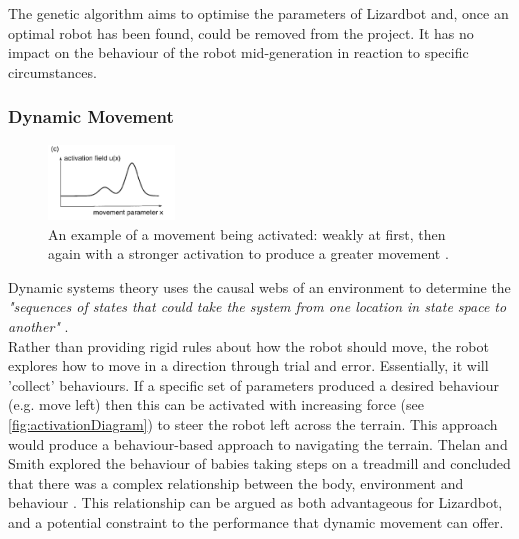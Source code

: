 \documentclass{article}
\begin{document}
The genetic algorithm aims to optimise the parameters of Lizardbot and, once an optimal robot has been found, could be removed from the project. It has no impact on the behaviour of the robot mid-generation in reaction to specific circumstances.\\

\newpage
\subsubsection{Dynamic Movement}
\label{sec:DST Aims}
\begin{figure}
    \centering
    \vspace*{-5mm}
    \includegraphics[width=0.3\textwidth]{activationExample}
    \caption{An example of a movement being activated: weakly at first, then again with a stronger activation to produce a greater movement \citep{dft}.}
    \label{fig:activationDiagram}
\end{figure}
Dynamic systems theory uses the causal webs of an environment to determine the \textit{"sequences of states that could take the system from one location in state space to another"} .\\
Rather than providing rigid rules about how the robot should move, the robot explores how to move in a direction through trial and error. Essentially, it will 'collect' behaviours. If a specific set of parameters produced a desired behaviour (e.g. move left) then this can be activated with increasing force (see \autoref{fig:activationDiagram}) to steer the robot left across the terrain. This approach would produce a behaviour-based approach to navigating the terrain. Thelan and Smith explored the behaviour of babies taking steps on a treadmill and concluded that there was a complex relationship between the body, environment and behaviour . This relationship can be argued as both advantageous for Lizardbot, and a potential constraint to the performance that dynamic movement can offer.\\
\end{document}
